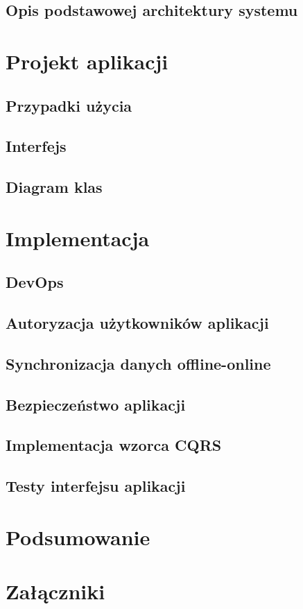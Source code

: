 \section{Opis podstawowej architektury systemu}
\chapter{Projekt aplikacji}
\section{Przypadki użycia}
\section{Interfejs}
\section{Diagram klas}
\chapter{Implementacja}
\section{DevOps}
\section{Autoryzacja użytkowników aplikacji}
\section{Synchronizacja danych offline-online}
\section{Bezpieczeństwo aplikacji}
\section{Implementacja wzorca CQRS}
\section{Testy interfejsu aplikacji}
\chapter{Podsumowanie}

 
\chapter*{Załączniki}
